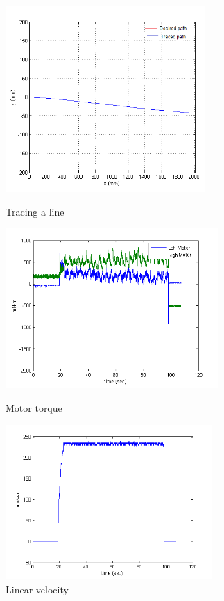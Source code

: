 \begin{figure}
	\begin{minipage}[t]{0.5\textwidth}
		\centering
		\includegraphics[width=3.0in]{Chapter5/fig/Line} 
		\caption{Tracing a line}\label{fig:line}
	\end{minipage}
	\hfill
	\begin{minipage}[t]{0.5\textwidth}
		\centering
		\includegraphics[width=3.2in]{Chapter5/fig/linTorq} 
		\caption{Motor torque}\label{fig:linTorq}
	\end{minipage}
	\begin{minipage}[t]{0.5\textwidth}
		\centering
		\includegraphics[width=3.1in]{Chapter5/fig/linVel} 
		\caption{Linear velocity}\label{fig:linVel}

\end{minipage}
\end{figure}
